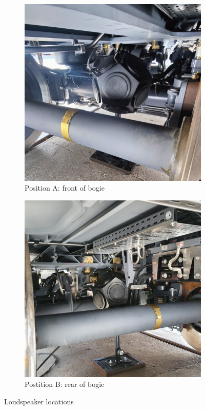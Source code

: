 \begin{figure}[H]
     \centering
     \begin{subfigure}[b]{0.4\textwidth}
         \centering
         \includegraphics[width=\linewidth]{fig/loudspeaker_position_A.jpg}
         \caption{Position A: front of bogie}
     \end{subfigure}
     \hspace{0.1\textwidth}
     \begin{subfigure}[b]{0.4\textwidth}
         \centering
         \includegraphics[width=\linewidth]{fig/loudspeaker_position_B.jpg}
         \caption{Postition B: rear of bogie}
     \end{subfigure}
     \caption{Loudspeaker locations}
     \label{fig:loudspeakerposition}
\end{figure}

